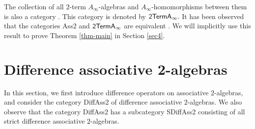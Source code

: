 \documentclass[a4paper,reqno,10pt]{amsart}
\theoremstyle{plain}
\theoremstyle{definition}
\theoremstyle{remark}
\begin{document}
The collection of all $2$-term $A_\infty$-algebras and $A_\infty$-homomorphisms between them is also a category \cite{keller}. This category is denoted by ${\sf 2TermA_\infty}.$ It has been observed that the categories {\sf Ass2} and ${\sf 2TermA_\infty}$ are equivalent \cite{das-hom,kh}. We will implicitly use this result to prove Theorem \ref{thm-main} in Section \ref{sec4}.


\section{Difference associative 2-algebras}\label{sec3}

In this section, we first introduce difference operators on associative $2$-algebras, and consider the category {\sf DiffAss2} of difference associative $2$-algebras. We also observe that the category {\sf DiffAss2} has a subcategory {\sf SDiffAss2} consisting of all strict difference associative $2$-algebras.
\end{document}
